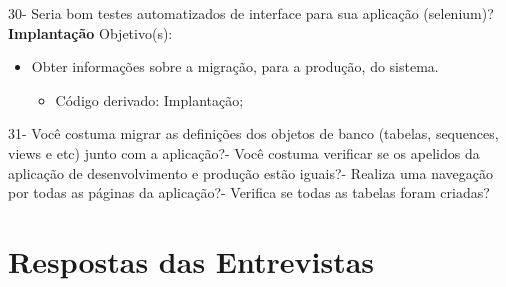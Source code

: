 \begin{anexosenv}
    30- Seria bom testes automatizados de interface para sua aplicação (selenium)?\newline
\newline
\textbf{Implantação}\newline\newline
Objetivo(s):
\begin{itemize}
\item Obter informações sobre a migração, para a produção, do sistema.
\begin{itemize}
\item Código derivado: Implantação;
\end{itemize}
\end{itemize}
    31- Você costuma migrar as definições dos objetos de banco (tabelas, sequences, views e etc) junto com a aplicação?- Você costuma verificar se os apelidos da aplicação de desenvolvimento e produção estão iguais?- Realiza uma navegação por todas as páginas da aplicação?- Verifica se todas as tabelas foram criadas?\newline
\newline
\chapter{Respostas das Entrevistas}

\begin{comment}
\begin{itemize}
\item \textbf{Desenvolvedor 1}
\end{itemize}

\textbf{Descrição do Desenvolvedor}

\begin{enumerate}
\item Qual é o curso que você faz?\newline
- Resposta 1
\item Quantos semestres são o curso?\newline
- Resposta 2
\item Está em qual semestre do curso?\newline
- Resposta 3
\item Qual é o nome da instituição de ensino?\newline
- Resposta 4
\item Quanto tempo de estágio?\newline
- Resposta 5
\end{enumerate}


\end{comment}
\end{anexosenv}
